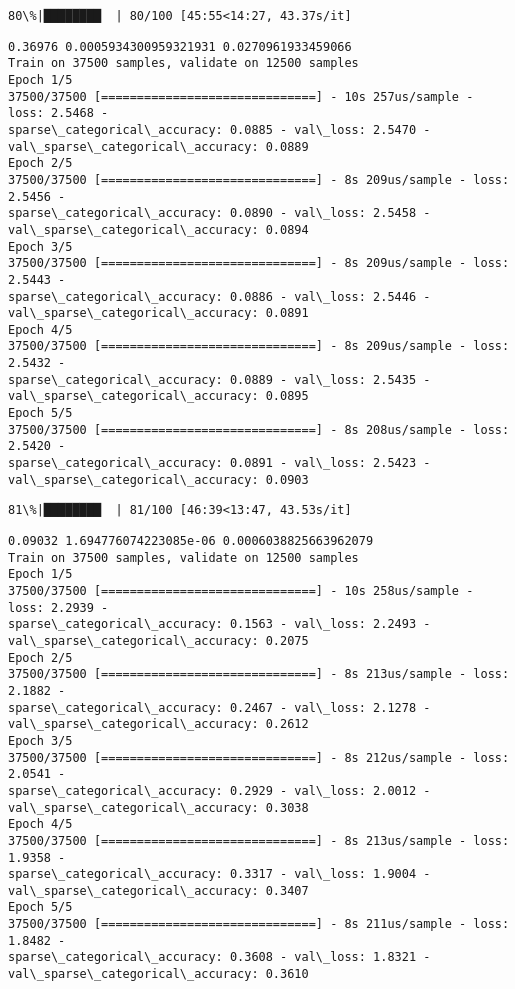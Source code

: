 \documentclass[11pt]{article}
\begin{document}
    \begin{Verbatim}[commandchars=\\\{\}]
 80\%|████████  | 80/100 [45:55<14:27, 43.37s/it]
    \end{Verbatim}

    \begin{Verbatim}[commandchars=\\\{\}]
0.36976 0.0005934300959321931 0.0270961933459066
Train on 37500 samples, validate on 12500 samples
Epoch 1/5
37500/37500 [==============================] - 10s 257us/sample - loss: 2.5468 -
sparse\_categorical\_accuracy: 0.0885 - val\_loss: 2.5470 -
val\_sparse\_categorical\_accuracy: 0.0889
Epoch 2/5
37500/37500 [==============================] - 8s 209us/sample - loss: 2.5456 -
sparse\_categorical\_accuracy: 0.0890 - val\_loss: 2.5458 -
val\_sparse\_categorical\_accuracy: 0.0894
Epoch 3/5
37500/37500 [==============================] - 8s 209us/sample - loss: 2.5443 -
sparse\_categorical\_accuracy: 0.0886 - val\_loss: 2.5446 -
val\_sparse\_categorical\_accuracy: 0.0891
Epoch 4/5
37500/37500 [==============================] - 8s 209us/sample - loss: 2.5432 -
sparse\_categorical\_accuracy: 0.0889 - val\_loss: 2.5435 -
val\_sparse\_categorical\_accuracy: 0.0895
Epoch 5/5
37500/37500 [==============================] - 8s 208us/sample - loss: 2.5420 -
sparse\_categorical\_accuracy: 0.0891 - val\_loss: 2.5423 -
val\_sparse\_categorical\_accuracy: 0.0903
    \end{Verbatim}

    \begin{Verbatim}[commandchars=\\\{\}]
 81\%|████████  | 81/100 [46:39<13:47, 43.53s/it]
    \end{Verbatim}

    \begin{Verbatim}[commandchars=\\\{\}]
0.09032 1.694776074223085e-06 0.0006038825663962079
Train on 37500 samples, validate on 12500 samples
Epoch 1/5
37500/37500 [==============================] - 10s 258us/sample - loss: 2.2939 -
sparse\_categorical\_accuracy: 0.1563 - val\_loss: 2.2493 -
val\_sparse\_categorical\_accuracy: 0.2075
Epoch 2/5
37500/37500 [==============================] - 8s 213us/sample - loss: 2.1882 -
sparse\_categorical\_accuracy: 0.2467 - val\_loss: 2.1278 -
val\_sparse\_categorical\_accuracy: 0.2612
Epoch 3/5
37500/37500 [==============================] - 8s 212us/sample - loss: 2.0541 -
sparse\_categorical\_accuracy: 0.2929 - val\_loss: 2.0012 -
val\_sparse\_categorical\_accuracy: 0.3038
Epoch 4/5
37500/37500 [==============================] - 8s 213us/sample - loss: 1.9358 -
sparse\_categorical\_accuracy: 0.3317 - val\_loss: 1.9004 -
val\_sparse\_categorical\_accuracy: 0.3407
Epoch 5/5
37500/37500 [==============================] - 8s 211us/sample - loss: 1.8482 -
sparse\_categorical\_accuracy: 0.3608 - val\_loss: 1.8321 -
val\_sparse\_categorical\_accuracy: 0.3610
    \end{Verbatim}
\end{document}
